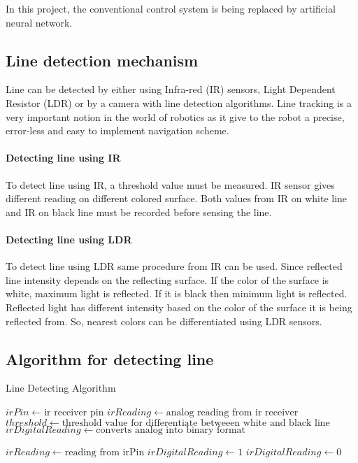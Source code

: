 \documentclass[14pt, a4paper]{article}
\begin{document}
In this project, the conventional control system is being replaced by artificial neural network. 

	\subsection{Line detection mechanism}
	Line can be detected by either using Infra-red (IR) sensors, Light Dependent Resistor (LDR) or by a camera with line detection algorithms. Line tracking is a very important notion in the world of robotics as it give to the robot a precise, error-less and easy to implement navigation scheme. 
	
		\paragraph{Detecting line using IR}
		To detect line using IR, a threshold value must be measured. IR sensor gives different reading on different colored surface. Both values from IR on white line and IR on black line must be recorded before sensing the line.
		
		\paragraph{Detecting line using LDR}
		To detect line using LDR same procedure from IR can be used. Since reflected line intensity depends on the reflecting surface. If the color of the surface is white, maximum light is reflected. If it is black then minimum light is reflected. Reflected light has different intensity based on the color of the surface it is being reflected from. So, nearest colors can be differentiated using LDR sensors. 
		
			\subsection{Algorithm for detecting line}
		\begin{algorithm}
		\caption{Line Detecting Algorithm}\label{linetracker}
		\begin{algorithmic}[1]
		
		\State $irPin \gets \text{ir receiver pin}$
		\State $irReading \gets \text {analog reading from ir receiver} $
		\State $threshold \gets \text {threshold value for differentiate betweeen white and black line} $
		\State $irDigitalReading \gets \text {converts analog into binary format} $
		
		\State $ irReading \gets \text{reading from irPin}$		
		\State $irDigitalReading \gets 1$
		\Else 
		\State $irDigitalReading \gets 0$
		\EndIf
		\EndProcedure
		\end{algorithmic}
		\end{algorithm}
		
\end{document}
